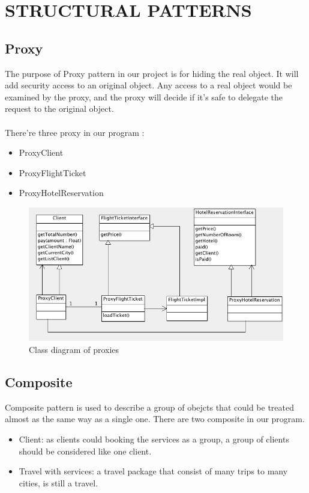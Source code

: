 \section{STRUCTURAL PATTERNS}

\subsection{Proxy}
The purpose of Proxy pattern in our project is for hiding the real object. It will add security access to an original object. Any access to a real object would be examined by the proxy, and the proxy will decide if it's safe to delegate the request to the original object. 

\paragraph{}
There're three proxy in our program :
\begin{itemize}
\item ProxyClient
\item ProxyFlightTicket
\item ProxyHotelReservation
\end{itemize}

\begin{figure}[h]
\centering
\includegraphics[width=12cm]{project/images/proxy.png}
\caption{Class diagram of proxies}
\end{figure}

\newpage
\subsection{Composite}
Composite pattern is used to describe a group of obejcts that could be treated almost as the same way as a single one. There are two composite in our program. 
\begin{itemize}
\item Client: as clients could booking the services as a group, a group of clients should be considered like one client. 
\item Travel with services: a travel package that consist of many trips to many cities, is still a travel.
\end{itemize}

